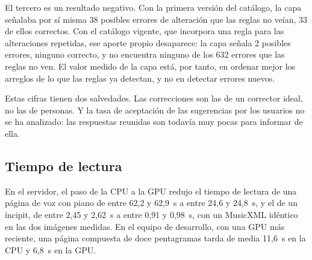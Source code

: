 \documentclass[conference]{IEEEtran}
\begin{document}
El tercero es un resultado negativo. Con la primera versión del catálogo,
la capa señalaba por sí misma 38 posibles errores de alteración que las
reglas no veían, 33 de ellos correctos. Con el catálogo vigente, que
incorpora una regla para las alteraciones repetidas, ese aporte propio
desaparece: la capa señala 2 posibles errores, ninguno correcto, y no
encuentra ninguno de los 632 errores que las reglas no ven.
El valor medido de la capa está, por tanto, en ordenar mejor los arreglos
de lo que las reglas ya detectan, y no en detectar errores nuevos.

Estas cifras tienen dos salvedades. Las correcciones son las de un
corrector ideal, no las de personas. Y la tasa de aceptación de las
sugerencias por los usuarios no se ha analizado: las respuestas reunidas
son todavía muy pocas para informar de ella.

\subsection{Tiempo de lectura}

En el servidor, el paso de la CPU a la GPU redujo el tiempo
de lectura de una página de voz con piano de entre 62,2 y 62,9~s a entre
24,6 y 24,8~s, y el de un íncipit, de entre 2,45 y 2,62~s a entre 0,91 y
0,98~s, con un MusicXML idéntico en las dos imágenes medidas.
En el equipo de desarrollo, con una GPU más reciente, una página
compuesta de doce pentagramas tarda de media 11,6~s en la CPU y 6,8~s en
la GPU.
\end{document}
